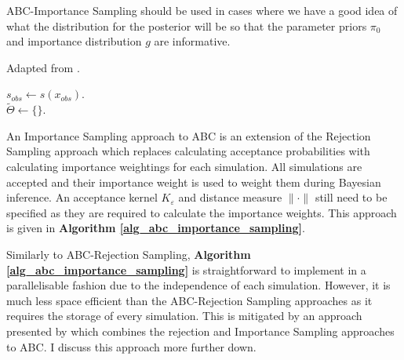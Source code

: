 \documentclass[11pt,a4paper]{article}
\theoremstyle{break}
\begin{document}
  \par ABC-Importance Sampling should be used in cases where we have a good idea of what the distribution for the posterior will be so that the parameter priors $\pi_0$ and importance distribution $g$ are informative.

  \begin{box_algorithm}\label{alg_abc_importance_sampling}
    Adapted from \cite[]{abc_samplers}.
    \par
    \begin{algorithm}[H]
      $s_{obs}\leftarrow s(x_{obs})$.\\
      $\tilde\Theta\leftarrow\{\}$.\\
    \end{algorithm}
  \end{box_algorithm}

  \par An Importance Sampling approach to ABC is an extension of the Rejection Sampling approach which replaces calculating acceptance probabilities with calculating importance weightings for each simulation. All simulations are accepted and their importance weight is used to weight them during Bayesian inference. An acceptance kernel $K_\varepsilon$ and distance measure $\|\cdot\|$ still need to be specified as they are required to calculate the importance weights. This approach is given in \textbf{Algorithm \ref{alg_abc_importance_sampling}}.

  \par Similarly to ABC-Rejection Sampling, \textbf{Algorithm \ref{alg_abc_importance_sampling}} is straightforward to implement in a parallelisable fashion due to the independence of each simulation. However, it is much less space efficient than the ABC-Rejection Sampling approaches as it requires the storage of every simulation. This is mitigated by an approach presented by \cite[]{constructing_summary_statistics_for_approximate_bayesian_computation_semi_automatic_ABC} which combines the rejection and Importance Sampling approaches to ABC. I discuss this approach more further down.
\end{document}
